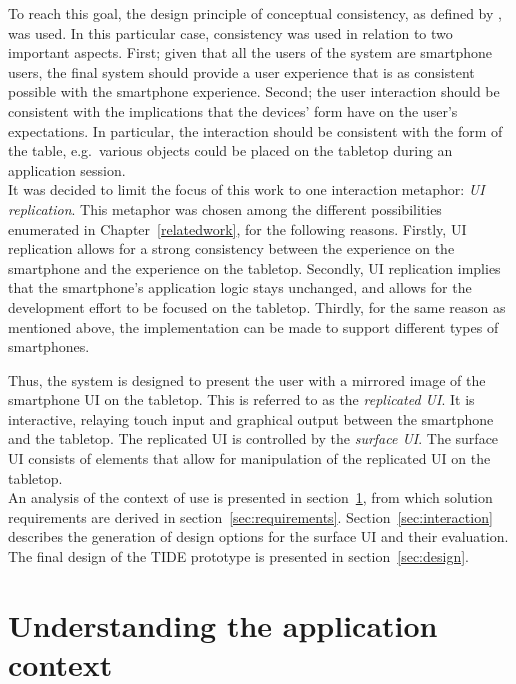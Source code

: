 To reach this goal, the design principle of conceptual consistency, as defined by \cite{Benyon:2010}, was used.
In this particular case, consistency was used in relation to two important aspects.
First; given that all the users of the system are smartphone users, the final system should provide a user experience that is as consistent possible with the smartphone experience.
Second; the user interaction should be consistent with the implications that the devices' form have on the user's expectations.
In particular, the interaction should be consistent with the form of the table, e.g.\ various objects could be placed on the tabletop during an application session.
\\
\linebreak
It was decided to limit the focus of this work to one interaction metaphor: \emph{UI replication}.
This metaphor was chosen among the different possibilities enumerated in Chapter~\ref{relatedwork}, for the following reasons.
Firstly, UI replication allows for a strong consistency between the experience on the smartphone and the experience on the tabletop.
Secondly, UI replication implies that the smartphone's application logic stays unchanged, and allows for the development effort to be focused on the tabletop.
Thirdly, for the same reason as mentioned above, the implementation can be made to support different types of smartphones.

Thus, the system is designed to present the user with a mirrored image of the smartphone UI on the tabletop.
This is referred to as the \emph{replicated UI}.
It is interactive, relaying touch input and graphical output between the smartphone and the tabletop.
The replicated UI is controlled by the \emph{surface UI}.
The surface UI consists of elements that allow for manipulation of the replicated UI on the tabletop.
\\
\linebreak
An analysis of the context of use is presented in section~\ref{sec:context}, from which solution requirements are derived in section~\ref{sec:requirements}.
Section~\ref{sec:interaction} describes the generation of design options for the surface UI and their evaluation.
The final design of the TIDE prototype is presented in section~\ref{sec:design}.

\section{Understanding the application context}
\label{sec:context}

